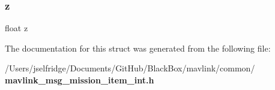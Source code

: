 \mbox{\label{struct____mavlink__mission__item__int__t_af73583b1e980b0aa03f9884812e9fd4d}} 
\subsubsection{z}
{\footnotesize\ttfamily float z}



The documentation for this struct was generated from the following file\+:\begin{DoxyCompactItemize}
\item 
/\+Users/jselfridge/\+Documents/\+Git\+Hub/\+Black\+Box/mavlink/common/\textbf{ mavlink\+\_\+msg\+\_\+mission\+\_\+item\+\_\+int.\+h}\end{DoxyCompactItemize}
